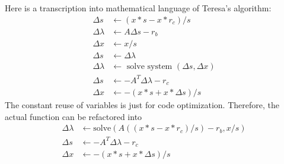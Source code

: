 \documentclass{article}
\begin{document}
Here is a transcription into mathematical language of Teresa's algorithm:
\begin{align*}
		\Delta s &\leftarrow (x * s - x * r_c) / s\\
		\Delta \lambda &\leftarrow A \Delta s - r_b\\
		\Delta x &\leftarrow x / s\\
		\Delta s &\leftarrow \Delta \lambda\\
		\Delta \lambda &\leftarrow \text{ solve system }(\Delta s, \Delta x)\\
		\Delta s &\leftarrow -A^T \Delta \lambda - r_c\\
		\Delta x &\leftarrow -(x*s + x * \Delta s) / s
\end{align*}
The constant reuse of variables is just for code optimization. Therefore, the actual function can be refactored into
\begin{align*}
		\Delta \lambda &\leftarrow \text{solve}(A((x*s - x*r_c) / s) - r_b, x/s)\\
		\Delta s &\leftarrow -A^T \Delta \lambda - r_c\\
		\Delta x &\leftarrow -(x*s + x*\Delta s) / s
\end{align*}
\end{document}
